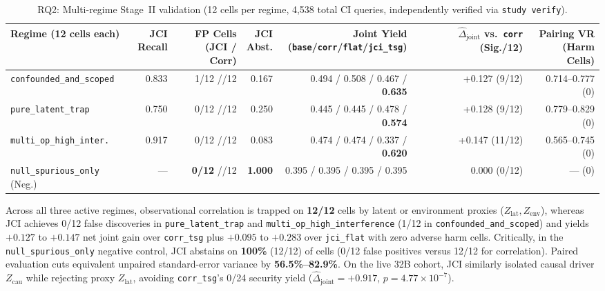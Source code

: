 \begin{table}[htbp]
  \centering
  \caption{RQ2: Multi-regime Stage~II validation (12 cells per regime, 4,538
  total CI queries, independently verified via \texttt{study verify}).}
  \label{tab:rq2-jci-regimes}
  \small
  \begin{tabularx}{\linewidth}{@{}lrrrrrr@{}}
    \toprule
    Regime (12 cells each) & \shortstack{JCI\\Recall} & \shortstack{FP Cells\\(JCI / Corr)} &
      \shortstack{JCI\\Abst.} & \shortstack{Joint Yield\\(\texttt{base}/\texttt{corr}/\texttt{flat}/\texttt{jci\_tsg})} &
      \shortstack{$\hat{\Delta}_{\mathrm{joint}}$ vs.\ \texttt{corr}\\(Sig./12)} &
      \shortstack{Pairing VR\\(Harm Cells)} \\
    \midrule
    \texttt{confounded\_and\_scoped} & 0.833 & 1/12 \;/\; 12/12 & 0.167 &
      0.494 / 0.508 / 0.467 / \textbf{0.635} & +0.127 (9/12) & 0.714--0.777 (0) \\
    \texttt{pure\_latent\_trap} & 0.750 & 0/12 \;/\; 12/12 & 0.250 &
      0.445 / 0.445 / 0.478 / \textbf{0.574} & +0.128 (9/12) & 0.779--0.829 (0) \\
    \texttt{multi\_op\_high\_inter.} & 0.917 & 0/12 \;/\; 12/12 & 0.083 &
      0.474 / 0.474 / 0.337 / \textbf{0.620} & +0.147 (11/12) & 0.565--0.745 (0) \\
    \texttt{null\_spurious\_only} (Neg.) & --- & \textbf{0/12} \;/\; 12/12 & \textbf{1.000} &
      0.395 / 0.395 / 0.395 / 0.395 & 0.000 (0/12) & --- (0) \\
    \bottomrule
  \end{tabularx}
\end{table}

Across all three active regimes, observational correlation is trapped on
\textbf{12/12} cells by latent or environment proxies ($Z_{\mathrm{lat}},
Z_{\mathrm{env}}$), whereas JCI achieves 0/12 false discoveries in
\texttt{pure\_latent\_trap} and \texttt{multi\_op\_high\_interference} (1/12 in
\texttt{confounded\_and\_scoped}) and yields $+0.127$ to $+0.147$ net joint gain
over \texttt{corr\_tsg} plus $+0.095$ to $+0.283$ over \texttt{jci\_flat} with
zero adverse harm cells. Critically, in the \texttt{null\_spurious\_only} negative
control, JCI abstains on \textbf{100\%} (12/12) of cells (0/12 false positives
versus 12/12 for correlation). Paired evaluation cuts equivalent unpaired
standard-error variance by \textbf{56.5\%--82.9\%}. On the live 32B cohort, JCI
similarly isolated causal driver $Z_{\mathrm{cau}}$ while rejecting proxy
$Z_{\mathrm{lat}}$, avoiding \texttt{corr\_tsg}'s 0/24 security yield
($\hat{\Delta}_{\mathrm{joint}} = +0.917$, $p=4.77\times 10^{-7}$).

